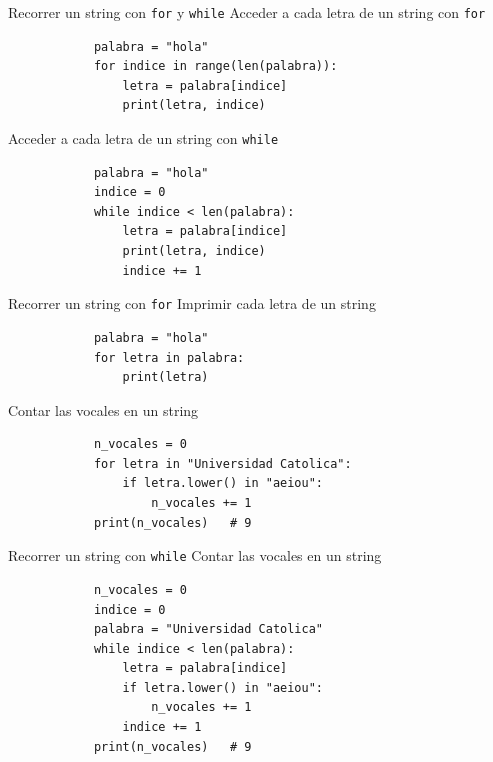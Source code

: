 \documentclass{beamer}
\begin{document}
    \begin{frame}[fragile, t]{Recorrer un string con \texttt{for} y \texttt{while}}
        Acceder a cada letra de un string con \texttt{for}
        \begin{verbatim}
            palabra = "hola"
            for indice in range(len(palabra)):
                letra = palabra[indice]
                print(letra, indice)
        \end{verbatim}
        Acceder a cada letra de un string con \texttt{while}
        \begin{verbatim}
            palabra = "hola"
            indice = 0
            while indice < len(palabra):
                letra = palabra[indice]
                print(letra, indice)
                indice += 1
        \end{verbatim}
    \end{frame}

    \begin{frame}[fragile, t]{Recorrer un string con \texttt{for}}
        Imprimir cada letra de un string
        \begin{verbatim}
            palabra = "hola"
            for letra in palabra:
                print(letra)
        \end{verbatim}
        Contar las vocales en un string
        \begin{verbatim}
            n_vocales = 0
            for letra in "Universidad Catolica":
                if letra.lower() in "aeiou":
                    n_vocales += 1
            print(n_vocales)   # 9
        \end{verbatim}
    \end{frame}

    \begin{frame}[fragile, t]{Recorrer un string con \texttt{while}}
        Contar las vocales en un string
        \begin{verbatim}
            n_vocales = 0
            indice = 0
            palabra = "Universidad Catolica"
            while indice < len(palabra):
                letra = palabra[indice]
                if letra.lower() in "aeiou":
                    n_vocales += 1
                indice += 1
            print(n_vocales)   # 9
        \end{verbatim}
    \end{frame}
\end{document}

